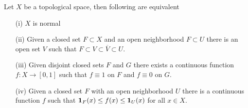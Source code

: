 \begin{thm}\label{UrysohnsLemma}Let $X$ be a
  topological space, then following are equivalent
\begin{itemize}
\item[(i)]$X$ is normal
\item[(ii)]Given a closed set $F \subset X$ and an open neighborhood
  $F \subset U$ there is an open set $V$ such that $F \subset V
  \subset \overline{V} \subset U$.
\item[(iii)]Given disjoint closed sets $F$ and $G$ there exists a
  continuous function $f : X \to [0,1]$ such that $f \equiv 1$ on $F$
  and $f \equiv 0$ on $G$.
\item[(iv)]Given a closed set $F$ with an open neighborhood $U$ there
  is a continuous function $f$ such that $\textbf{1}_{F}(x) \leq
  f(x) \leq \textbf{1}_{U}(x)$ for all $x \in X$.
\end{itemize}
\end{thm}
